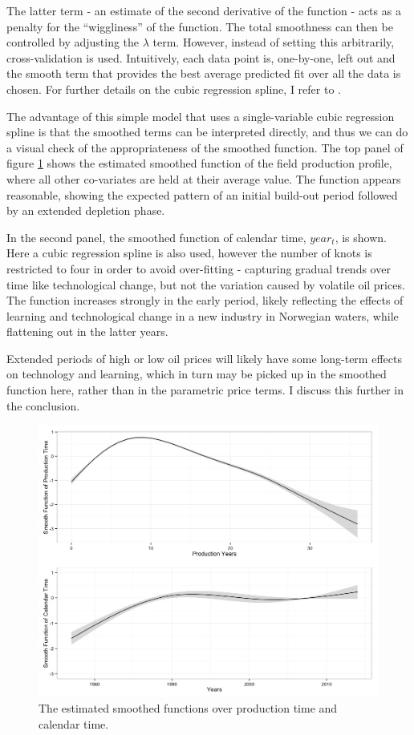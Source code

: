 \documentclass[12pt]{article}
\begin{document}
The latter term - an estimate of the second derivative of the function - acts as a penalty for the ``wiggliness'' of the function. The total smoothness can then be controlled by adjusting the $\lambda$ term. However, instead of setting this arbitrarily, cross-validation is used. Intuitively, each data point is, one-by-one, left out and the smooth term that provides the best average predicted fit over all the data is chosen.  For further details on the cubic regression spline, I refer to \citet{wood_generalized_2006}.

The advantage of this simple model that uses a single-variable cubic regression spline is that the smoothed terms can be interpreted directly, and thus we can do a visual check of the appropriateness of the smoothed function. The top panel of figure \ref{smooths} shows the estimated smoothed function of the field production profile, where all other co-variates are held at their average value.  The function appears reasonable, showing the expected pattern of an initial build-out period followed by an extended depletion phase. 

In the second panel, the smoothed function of calendar time, $year_t$, is shown. Here a cubic regression spline is also used, however the number of knots is restricted to four in order to avoid over-fitting - capturing gradual trends over time like technological change, but not the variation caused by volatile oil prices. The function increases strongly in the early period, likely reflecting the effects of learning and technological change in a new industry in Norwegian waters, while flattening out in the latter years. 

Extended periods of high or low oil prices will likely have some long-term effects on technology and learning, which in turn may be picked up in the smoothed function here, rather than in the parametric price terms.  I discuss this further in the conclusion.  

\begin{figure}
	\includegraphics[width=1\textwidth]{figures/smooths.png}
	\caption{The estimated smoothed functions over production time and calendar time.}
	\label{smooths}
\end{figure}
\end{document}
